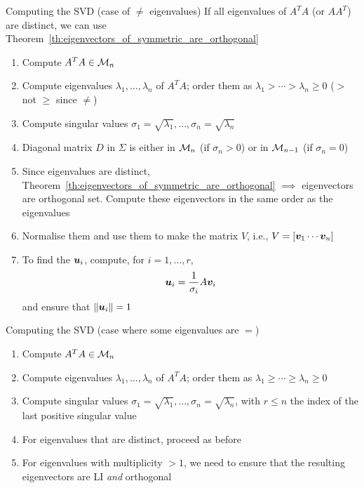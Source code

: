 \documentclass[aspectratio=169]{beamer}\usepackage[]{graphicx}\usepackage[]{xcolor}
\begin{document}
\begin{frame}{Computing the SVD (case of $\neq$ eigenvalues)}
If all eigenvalues of $A^TA$ (or $AA^T$) are distinct, we can use Theorem~\ref{th:eigenvectors_of_symmetric_are_orthogonal}
\vfill
\begin{enumerate}
\item Compute $A^TA\in\mathcal{M}_n$
\item Compute eigenvalues $\lambda_1,\ldots,\lambda_n$ of $A^TA$; order them as $\lambda_1>\cdots>\lambda_n\geq 0$ ($>$ not $\geq$ since $\neq$)
\item Compute singular values $\sigma_1=\sqrt{\lambda_1},\ldots,\sigma_n=\sqrt{\lambda_n}$
\item Diagonal matrix $D$ in $\Sigma$ is either in $\mathcal{M}_n$ (if $\sigma_n>0$) or in $\mathcal{M}_{n-1}$ (if $\sigma_n=0$)
\end{enumerate}
\end{frame}


\begin{frame}
\begin{enumerate}
\setcounter{enumi}{4}
\item Since eigenvalues are distinct, Theorem~\ref{th:eigenvectors_of_symmetric_are_orthogonal} $\implies$ eigenvectors are orthogonal set. Compute these eigenvectors in the same order as the eigenvalues
\item Normalise them and use them to make the matrix $V$, i.e., $V=[\bm{v}_1\cdots\bm{v}_n]$
\item To find the $\bm{u}_i$, compute, for $i=1,\ldots,r$,
\[
\bm{u}_i = \frac{1}{\sigma_i}A\bm{v}_i
\]
and ensure that $\|\bm{u}_i\|=1$
\end{enumerate}
\end{frame}


\begin{frame}{Computing the SVD (case where some eigenvalues are $=$)}
\begin{enumerate}
\item Compute $A^TA\in\mathcal{M}_n$
\item Compute eigenvalues $\lambda_1,\ldots,\lambda_n$ of $A^TA$; order them as $\lambda_1\geq\cdots\geq\lambda_n\geq 0$
\item Compute singular values $\sigma_1=\sqrt{\lambda_1},\ldots,\sigma_n=\sqrt{\lambda_n}$, with $r\leq n$ the index of the last positive singular value
\item For eigenvalues that are distinct, proceed as before
\item For eigenvalues with multiplicity $>1$, we need to ensure that the resulting eigenvectors are LI \emph{and} orthogonal
\end{enumerate}
\end{frame}
\end{document}
